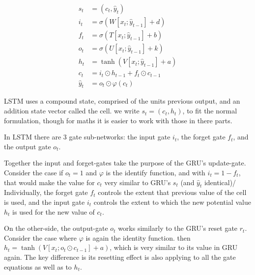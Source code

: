 \documentclass[12pt,parskip]{komatufte}
\begin{document}
\begin{align}
s_t &= (c_t, \hat{y}_t)\\
%
i_t &= \sigma \left( W[x_t; \hat{y}_{t-1}] + d \right) \\
f_t &= \sigma \left( T[x_t; \hat{y}_{t-1}] + b \right) \\
o_t &= \sigma \left( U[x_t; \hat{y}_{t-1}] + k \right) \\
%
h_t &= \tanh \left( V[x_t; \hat{y}_{t-1}] + a \right) \\
c_t &=  i_t\odot h_{t-1} + f_t \odot c_{t-1} \\
\hat{y}_t &= o_t \odot \varphi(c_t)
\end{align}

LSTM uses a compound state, comprised of the units previous output, and an addition state vector called the cell.
we write $s_t = (c_t, h_t)$,
to fit the normal formulation,
though for maths it is easier to work with those in there parts.

In LSTM there are 3 gate sub-networks:
the input gate $i_t$, the forget gate $f_t$, and the output gate $o_t$.

Together the input and forget-gates take the purpose of the GRU's update-gate.
Consider the case if $o_t=1$ and $\varphi$ is the identify function,
and with $i_t=1-f_t$, that would make the value for $c_t$ very similar to GRU's $s_t$ (and $\hat{y}_t$ identical)/
Individually, the forget gate $f_t$ controls the extent that previous value of the cell is used,
and the input gate $i_t$ controls the extent to which the new potential value $h_t$ is used for the new value of $c_t$.

On the other-side, the output-gate $o_t$ works similarly to the GRU's reset gate $r_t$.
Consider the case where $\varphi$ is again the identity function.
then $h_t = \tanh \left( V[x_t; o_t\odot c_{t-1}] + a \right)$,
which is very similar to its value in GRU again.
The key difference is its resetting effect is also applying to all the gate equations as well as to $h_t$.
\end{document}
